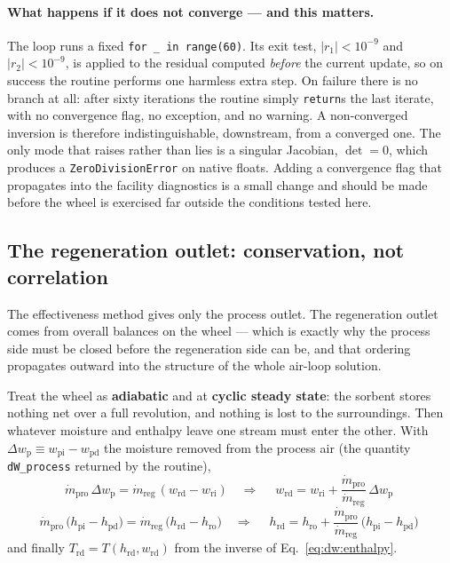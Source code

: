 \documentclass[11pt]{article}
\newcommand{\mdp}{\ensuremath{\dot m_{\mathrm{pro}}}}
\newcommand{\mdr}{\ensuremath{\dot m_{\mathrm{reg}}}}
\begin{document}
\paragraph{What happens if it does not converge --- and this matters.}
The loop runs a fixed \texttt{for \_ in range(60)}. Its exit test,
$|r_1|<10^{-9}$ and $|r_2|<10^{-9}$, is applied to the residual computed
\emph{before} the current update, so on success the routine performs one
harmless extra step. On failure there is no branch at all: after sixty
iterations the routine simply \texttt{return}s the last iterate, with no
convergence flag, no exception, and no warning. A non-converged inversion is
therefore indistinguishable, downstream, from a converged one. The only mode
that raises rather than lies is a singular Jacobian, $\det=0$, which produces
a \texttt{ZeroDivisionError} on native floats. Adding a convergence flag that
propagates into the facility diagnostics is a small change and should be made
before the wheel is exercised far outside the conditions tested here.

\subsection{The regeneration outlet: conservation, not correlation}
\label{sec:dw:regen}

The effectiveness method gives only the process outlet. The regeneration
outlet comes from overall balances on the wheel --- which is exactly why the
process side must be closed before the regeneration side can be, and that
ordering propagates outward into the structure of the whole air-loop
solution.

Treat the wheel as \textbf{adiabatic} and at \textbf{cyclic steady state}: the
sorbent stores nothing net over a full revolution, and nothing is lost to the
surroundings. Then whatever moisture and enthalpy leave one stream must enter
the other. With
$\Delta w_{\mathrm{p}} \equiv w_{\mathrm{pi}} - w_{\mathrm{pd}}$ the moisture
removed from the process air (the quantity \texttt{dW\_process} returned by
the routine),
\begin{equation}
\mdp\,\Delta w_{\mathrm{p}} = \mdr\,(w_{\mathrm{rd}}-w_{\mathrm{ri}})
\quad\Longrightarrow\quad
\boxed{\;w_{\mathrm{rd}} = w_{\mathrm{ri}}
+ \frac{\mdp}{\mdr}\,\Delta w_{\mathrm{p}}\;}
\label{eq:dw:wrd}
\end{equation}
\begin{equation}
\mdp\,\big(h_{\mathrm{pi}}-h_{\mathrm{pd}}\big)
= \mdr\,\big(h_{\mathrm{rd}}-h_{\mathrm{ro}}\big)
\quad\Longrightarrow\quad
\boxed{\;h_{\mathrm{rd}} = h_{\mathrm{ro}}
+ \frac{\mdp}{\mdr}\,\big(h_{\mathrm{pi}}-h_{\mathrm{pd}}\big)\;}
\label{eq:dw:hrd}
\end{equation}
and finally $T_{\mathrm{rd}} = T(h_{\mathrm{rd}},w_{\mathrm{rd}})$ from the
inverse of Eq.~\eqref{eq:dw:enthalpy}.
\end{document}
